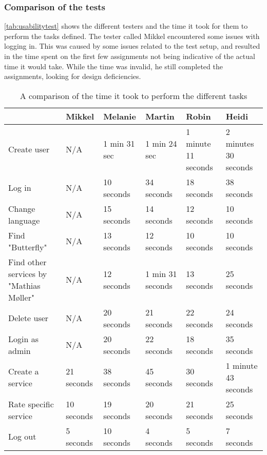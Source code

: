 \subsubsection{Comparison of the tests}
\autoref{tab:usabilitytest} shows the different testers and the time it took for them to perform the tasks defined.
The tester called Mikkel encountered some issues with logging in.
This was caused by some issues related to the test setup, and resulted in the time spent on the first few assignments not being indicative of the actual time it would take.
While the time was invalid, he still completed the assignments, looking for design deficiencies.
\begin{table}[]
    \begin{tabular}{|l|l|l|l|l|l|}
    \hline
                                            & Mikkel     & Melanie      & Martin           & Robin                  & Heidi               \\ \hline
    Create user                             & N/A        & 1 min 31 sec & 1 min 24 sec     & 1 minute 11 seconds    & 2 minutes 30 seconds \\ \hline
    Log in                                  & N/A        & 10 seconds   & 34 seconds       & 18 seconds             & 38 seconds \\ \hline
    Change language                         & N/A        & 15 seconds   & 14 seconds       & 12 seconds             & 10 seconds \\ \hline
    Find "Butterfly"                        & N/A        & 13 seconds   & 12 seconds       & 10 seconds             & 10 seconds \\ \hline
    Find other services by "Mathias Møller" & N/A        & 12 seconds   & 1 min 31 seconds & 13 seconds             & 25 seconds \\ \hline
    Delete user                             & N/A        & 20 seconds   & 21 seconds       & 22 seconds             & 24 seconds \\ \hline
    Login as admin                          & N/A        & 20 seconds   & 22 seconds       & 18 seconds             & 35 seconds\\ \hline
    Create a service                        & 21 seconds & 38 seconds   & 45 seconds       & 30 seconds             & 1 minute 43 seconds \\ \hline
    Rate specific service                   & 10 seconds & 19 seconds   & 20 seconds       & 21 seconds             & 25 seconds \\ \hline
    Log out                                 & 5 seconds  & 10 seconds   & 4 seconds        & 5 seconds              & 7 seconds \\ \hline
    \end{tabular}
    \caption{A comparison of the time it took to perform the different tasks}
    \label{tab:usabilitytest}
\end{table}
